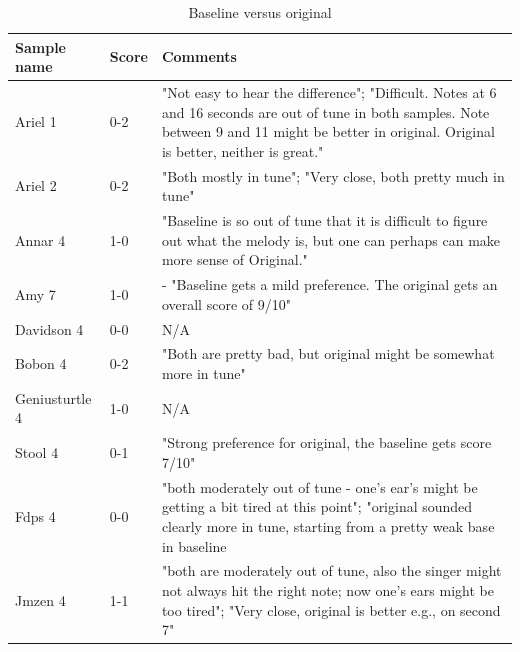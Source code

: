 \begin{table}
  \begin{center}
    \caption{Baseline versus original}
    \label{tab:table1}
    \begin{tabularx}{\columnwidth}{|l|l|X|}
    \hline
\textbf{Sample name} & \textbf{Score} & \textbf{Comments} \\
\hline\hline
Ariel 1 & 0-2 & "Not easy to hear the difference"; "Difficult. Notes at 6 and 16 seconds are out of tune in both samples. Note between 9 and 11 might be better in original. Original is better, neither is great."\\
\hline
Ariel 2 & 0-2 & "Both mostly in tune"; "Very close, both pretty much in tune"\\ 
\hline
Annar 4 & 1-0 & "Baseline is so out of tune that it is difficult to figure out what the melody is, but one can perhaps can make more sense of Original."\\ 
\hline
Amy 7 & 1-0 & - "Baseline gets a mild preference. The original gets an overall score of 9/10"\\
\hline
Davidson 4 & 0-0 & N/A\\ 
\hline
Bobon 4 & 0-2 & "Both are pretty bad, but original might be somewhat more in tune" \\ 
\hline
Geniusturtle 4 & 1-0 & N/A\\ 
\hline
Stool 4 & 0-1 & "Strong preference for original, the baseline gets score 7/10"\\ 
\hline
Fdps 4 & 0-0 & "both moderately out of tune - one's ear's might be getting a bit tired at this point"; "original sounded clearly more in tune, starting from a pretty weak base in baseline\\ 
\hline
Jmzen 4 & 1-1 & "both are moderately out of tune, also the singer might not always hit the right note; now one's ears might be too tired"; "Very close, original is better e.g., on second 7" \\ 
\hline
    \end{tabularx}
  \end{center}
\end{table}

